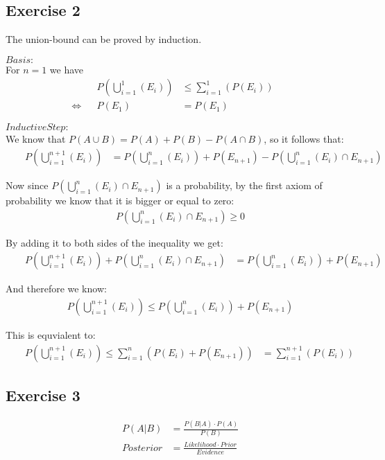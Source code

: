\subsection*{Exercise 2}
The union-bound can be proved by induction.

\noindent $Basis:$ \\ For $n=1$ we have
\setcounter{equation}{0}
\begin{align}
& & P(\bigcup_{i=1}^{1}(E_i)) & \leq \sum_{i=1}^{1}(P(E_i)) & & \\
\Leftrightarrow & & P(E_1) & = P(E_1) & & 
\end{align}

\noindent $Inductive Step:$ \\
We know that $P(A \cup B) = P(A) + P(B) - P(A \cap B)$, so it follows that:
\begin{align}
& & P(\bigcup_{i=1}^{n+1}(E_i)) & = P(\bigcup_{i=1}^{n}(E_i)) + P(E_{n+1}) - P(\bigcup_{i=1}^{n}(E_i) \cap E_{n+1}) & &
\end{align}

\noindent Now since $P(\bigcup_{i=1}^{n}(E_i) \cap E_{n+1})$ is a probability, by the first axiom of probability we know that it is bigger or equal to zero:
\begin{align}
 P(\bigcup_{i=1}^{n}(E_i) \cap E_{n+1}) \geq 0 
\end{align}

\noindent By adding it to both sides of the inequality we get:
\begin{align}
& & P(\bigcup_{i=1}^{n+1}(E_i)) + P(\bigcup_{i=1}^{n}(E_i) \cap E_{n+1}) & = P(\bigcup_{i=1}^{n}(E_i)) + P(E_{n+1})  & &
\end{align}

\noindent And therefore we know:
\begin{align}
& & P(\bigcup_{i=1}^{n+1}(E_i)) \leq P(\bigcup_{i=1}^{n}(E_i)) + P(E_{n+1})  & &
\end{align}

\noindent This is equvialent to:
\begin{align}
& & P(\bigcup_{i=1}^{n+1}(E_i)) \leq \sum_{i=1}^{n}(P(E_i) + P(E_{n+1})) & = \sum_{i=1}^{n+1}(P(E_i)) & &
\end{align}
\setcounter{equation}{0}


\subsection*{Exercise 3}
\begin{align*}
P(A|B) & = \frac{P(B|A) \cdot P(A)}{P(B)} \\
Posterior & = \frac{Likelihood \cdot Prior}{Evidence}
\end{align*}

